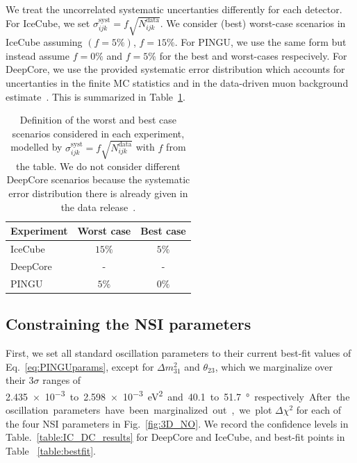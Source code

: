 \documentclass[draft=True]{revtex4-2}
\newcommand{\dm}{\Delta m^2_{31}}
\begin{document}
We treat the uncorrelated systematic uncertanties differently for each detector. For IceCube, we set $\sigma_{ijk}^\text{syst} = f\sqrt{N_{ijk}^\text{data}}$. We consider (best) worst-case scenarios in IceCube assuming
$(f=5\%)$, $f=15\%$. For PINGU, we use the same form but instead assume $f=0\%$ and $f=5\%$ for the best and worst-cases respecively. %
For DeepCore, we use the provided systematic error distribution which accounts for uncertanties in the finite MC statistics and in the data-driven 
muon background estimate~\cite{DC2019data}. This is summarized in Table~\ref{table:syst_errors}.  %
{\renewcommand{\arraystretch}{1.2}
\begin{table}
   \begin{tabular}{lcc}
      \hline \hline
      Experiment & Worst case & Best case \\
      \hline
      IceCube & $15\%$ & $5\%$ \\
      DeepCore & - & - \\
      PINGU & $5\%$ & $0\%$ \\
      \hline \hline
   \end{tabular}
   \caption{Definition of the worst and best case scenarios considered in each experiment, modelled by $\sigma_{ijk}^\text{syst} = f\sqrt{N_{ijk}^\text{data}}$ with $f$ from the table.
   We do not consider different DeepCore scenarios because the systematic error distribution there is already given in the data release~\cite{DC2019data}.}\label{table:syst_errors}
\end{table}

\subsection{Constraining the NSI parameters}
First, we set all standard oscillation parameters to their current best-fit values of Eq.~\ref{eq:PINGUparams}, except for $\dm$ and $\theta_{23}$, 
which we marginalize over their $3\sigma$ ranges of \SI{2.435e-3} to \SI{2.598e-3}{\electronvolt^2} and \SI{40.1} to \SI{51.7}{\degree} respectively. %
After the oscillation parameters have been marginalized out, we plot $\Delta \chi^2$ for each of the four NSI parameters in Fig.~\ref{fig:3D_NO}. We record the 
confidence levels in Table.~\ref{table:IC_DC_results} for DeepCore and IceCube, and best-fit points in Table ~\ref{table:bestfit}.

}
\end{document}
